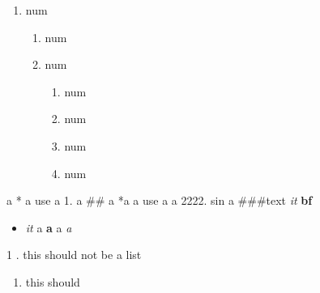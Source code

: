 \documentclass{xyz}
\begin{document}
    \begin{enumerate}
        \item num
        \begin{enumerate}
            \item num
            \item num
            \begin{enumerate}
                \item num
                \item num
                \item num
                \item num
            \end{enumerate}
        \end{enumerate}
    \end{enumerate}
    a *
    a use
    a 1.
    a ##
    a *a 
    a use a
    a 2222. sin
    a ###text
    \textit{it} \textbf{bf}
    \begin{itemize}
        \item \textit{it } a \textbf{a\*\*\* } a \textit{a}
    \end{itemize}

    1 . this should not be a list
    \begin{enumerate}
        \item this should
    \end{enumerate}
\end{document}
